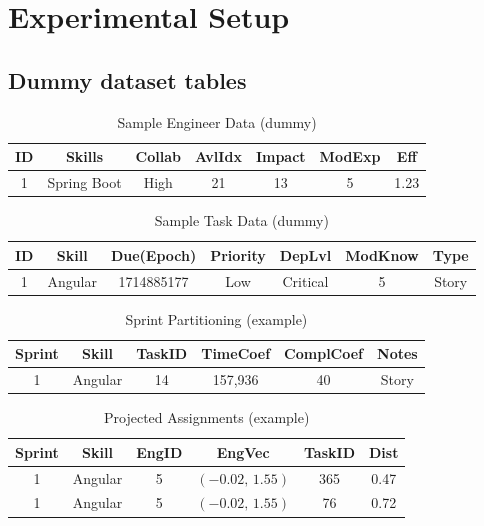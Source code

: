 \documentclass[journal]{IEEEtran}
\begin{document}
\section{Experimental Setup}\label{sec:exp}

\subsection{Dummy dataset tables}
\begin{table}[H]
    \centering
    \caption{Sample Engineer Data (dummy)}
    \label{tab:engineers}
    \begin{tabular}{ccccccc}
    \toprule
    ID & Skills & Collab & AvlIdx & Impact & ModExp & Eff \\
    \midrule
    1 & Spring Boot & High & 21 & 13 & 5 & 1.23 \\
    \bottomrule
    \end{tabular}
\end{table}

\begin{table}[H]
    \centering
    \caption{Sample Task Data (dummy)}
    \label{tab:tasks}
    \begin{tabular}{ccccccc}
    \toprule
    ID & Skill & Due(Epoch) & Priority & DepLvl & ModKnow & Type \\
    \midrule
    1 & Angular & 1714885177 & Low & Critical & 5 & Story \\
    \bottomrule
    \end{tabular}
\end{table}

\begin{table}[H]
    \centering
    \caption{Sprint Partitioning (example)}
    \label{tab:sprints}
    \begin{tabular}{cccccc}
    \toprule
    Sprint & Skill & TaskID & TimeCoef & ComplCoef & Notes \\
    \midrule
    1 & Angular & 14 & 157{,}936 & 40 & Story \\
    \bottomrule
    \end{tabular}
\end{table}

\begin{table}[H]
    \centering
    \caption{Projected Assignments (example)}
    \label{tab:assignments}
    \begin{tabular}{cccccc}
    \toprule
    Sprint & Skill & EngID & EngVec & TaskID & Dist \\
    \midrule
    1 & Angular & 5 & $(-0.02,\,1.55)$ & 365 & 0.47 \\
    1 & Angular & 5 & $(-0.02,\,1.55)$ & 76  & 0.72 \\
    \bottomrule
    \end{tabular}
\end{table}
\end{document}
